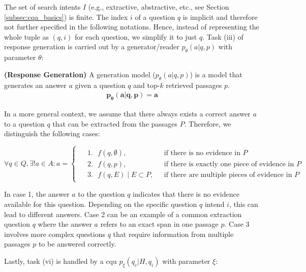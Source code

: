 The set of search intents $I$ (e.g., extractive, abstractive, etc., see Section \ref{subsec:cqa_basics}) is finite. The index $i$ of a question $q$ is implicit and therefore not further specified in the following notations. Hence, instead of representing the whole tuple as $(q,i)$ for each question, we simplify it to just $q$. Task (iii) of response generation is carried out by a generator/reader $p_\theta(a|q,p)$ with parameter $\theta$:

\begin{definition}
    \textbf{(Response Generation)} A generation model ($p_\theta(a|q,p)$) is a model that generates an answer $a$ given a question $q$ and top-$k$ retrieved passages $p$.
    \begin{align*}
        \mathbf{p_\theta(a|q,p) = a}
    \end{align*}
    \label{def:generation}
\end{definition}

In a more general context, we assume that there always exists a correct answer $a$ to a question $q$ that can be extracted from the passages $P$. Therefore, we distinguish the following cases:

\begin{equation}
    \forall q \in Q, \exists! a \in A : a = 
    \begin{cases}
        \begin{aligned}
            &1. \text{ } f(q, \emptyset), \text{ } &\text{if there is no evidence in } P \\
            &2. \text{ } f(q, p), \text{ } &\text{if there is exactly one piece of evidence in } P \\
            &3. \text{ } f(q, E) \mid E \subset P, \text{ } &\text{if there are multiple pieces of evidence in } P
        \end{aligned}
    \end{cases}
\end{equation}

In case 1, the answer $a$ to the question $q$ indicates that there is no evidence available for this question. Depending on the specific question $q$ intend $i$, this can lead to different answers. Case 2 can be an example of a common extraction question $q$ where the answer $a$ refers to an exact span in one passage $p$. Case 3 involves more complex questions $q$ that require information from multiple passages $p$ to be answered correctly.

Lastly, task (vi) is handled by a \gls{cqu} $p_\xi(q_c|H,q_i)$ with parameter $\xi$:

